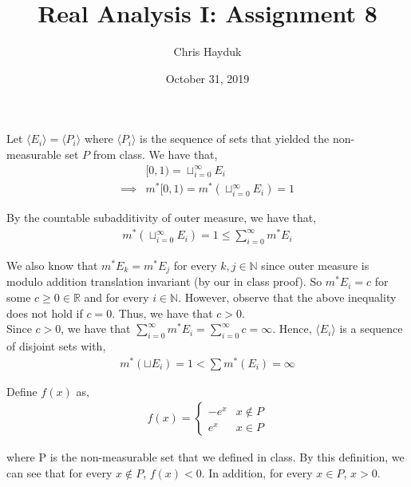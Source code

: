 \documentclass[12pt]{article}
\newenvironment{problem}[2][Problem]{\begin{trivlist}
\item[\hskip \labelsep {\bfseries #1}\hskip \labelsep {\bfseries #2.}]}{\end{trivlist}}
\begin{document}
\title{Real Analysis I: Assignment 8}

\author{Chris Hayduk}
\date{October 31, 2019}

\maketitle

\begin{problem}{1}
\end{problem}

Let $\langle E_i \rangle = \langle P_i \rangle$ where $\langle P_i \rangle$ is the sequence of sets that yielded the non-measurable set $P$ from class. We have that,
\begin{align*}
&[0, 1) = \sqcup_{i=0}^{\infty} E_i\\
\implies &m^*[0, 1) = m^*(\sqcup_{i=0}^{\infty} E_i) = 1
\end{align*}

By the countable subadditivity of outer measure, we have that,
\begin{align*}
m^*(\sqcup_{i=0}^{\infty} E_i) = 1 \leq \sum_{i=0}^{\infty} m^*E_i
\end{align*}

We also know that $m^*E_k = m^*E_j$ for every $k, j \in \mathbb{N}$ since outer measure is modulo addition translation invariant (by our in class proof). So $m^*E_i = c$ for some $c \geq 0 \in \mathbb{R}$ and for every $i \in \mathbb{N}$. However, observe that the above inequality does not hold if $c = 0$. Thus, we have that $c > 0$.\\

Since $c > 0$, we have that $\sum_{i=0}^{\infty} m^*E_i = \sum_{i=0}^{\infty} c = \infty$. Hence, $\langle E_i \rangle$ is a sequence of disjoint sets with,
\begin{align*}
m^*(\sqcup E_i) = 1 < \sum m^*(E_i) = \infty
\end{align*}

\begin{problem}{2}
\end{problem}

Define $f(x)$ as,
\begin{align*}
f(x) = \begin{cases}
-e^x & x \not\in P\\
e^x & x \in P
\end{cases}
\end{align*}

where P is the non-measurable set that we defined in class. By this definition, we can see that for every $x \not\in P$, $f(x) < 0$. In addition, for every $x \in P$, $x > 0$.\\
\end{document}
